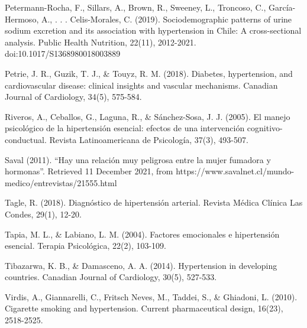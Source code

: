 \documentclass{aa}
\begin{document}
\begin{hangparas}{.25in}{1}
Petermann-Rocha, F., Sillars, A., Brown, R., Sweeney, L., Troncoso, C., García-Hermoso, A., . . . Celis-Morales, C. (2019). Sociodemographic patterns of urine sodium excretion and its association with hypertension in Chile: A cross-sectional analysis. Public Health Nutrition, 22(11), 2012-2021. doi:10.1017/S1368980018003889

Petrie, J. R., Guzik, T. J., \& Touyz, R. M. (2018). Diabetes, hypertension, and cardiovascular disease: clinical insights and vascular mechanisms. Canadian Journal of Cardiology, 34(5), 575-584.

Riveros, A., Ceballos, G., Laguna, R., \& Sánchez-Sosa, J. J. (2005). El manejo psicológico de la hipertensión esencial: efectos de una intervención cognitivo-conductual. Revista Latinoamericana de Psicología, 37(3), 493-507.

Saval (2011). “Hay una relación muy peligrosa entre la mujer fumadora y hormonas”. Retrieved 11 December 2021, from https://www.savalnet.cl/mundo-medico/entrevistas/21555.html

Tagle, R. (2018). Diagnóstico de hipertensión arterial. Revista Médica Clínica Las Condes, 29(1), 12-20.

Tapia, M. L., \& Labiano, L. M. (2004). Factores emocionales e hipertensión esencial. Terapia Psicológica, 22(2), 103-109.

Tibazarwa, K. B., \& Damasceno, A. A. (2014). Hypertension in developing countries. Canadian Journal of Cardiology, 30(5), 527-533. 

Virdis, A., Giannarelli, C., Fritsch Neves, M., Taddei, S., \& Ghiadoni, L. (2010). Cigarette smoking and hypertension. Current pharmaceutical design, 16(23), 2518-2525.


\end{hangparas}
\end{document}
